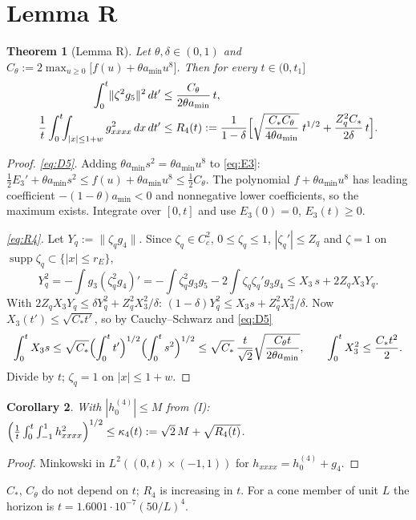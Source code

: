 \documentclass[11pt]{article}
\newtheorem{theorem}{Theorem}\newtheorem{lemma}[theorem]{Lemma}\newtheorem{corollary}[theorem]{Corollary}
\newcommand{\nrm}[1]{\lVert #1\rVert}\newcommand{\fn}[1]{\texttt{\detokenize{#1}}}
\begin{document}
\section{Lemma R}
\begin{theorem}[Lemma R]\label{thm:R}
Let $\theta,\delta\in(0,1)$ and $C_\theta:=2\max_{u\ge0}\bigl[f(u)+\theta a_{\min}u^8\bigr]$. Then for every $t\in(0,t_1]$
\begin{align}
\int_0^t\nrm{\zeta^2g_5}^2\,dt'&\le\frac{C_\theta}{2\theta a_{\min}}\,t,\label{eq:D5}\\
\frac1t\int_0^t\!\!\int_{|x|\le1+w}g_{xxxx}^2\,dx\,dt'&\le R_4(t):=\frac1{1-\delta}\Bigl[\sqrt{\frac{C_*C_\theta}{4\theta a_{\min}}}\;t^{1/2}+\frac{Z_q^2C_*}{2\delta}\,t\Bigr].\label{eq:R4}
\end{align}
\end{theorem}
\begin{proof}
\emph{\eqref{eq:D5}.} Adding $\theta a_{\min}s^2=\theta a_{\min}u^8$ to \eqref{eq:E3}: $\tfrac12E_3'+\theta a_{\min}s^2\le f(u)+\theta a_{\min}u^8\le\tfrac12C_\theta$. The polynomial $f+\theta a_{\min}u^8$ has leading coefficient $-(1-\theta)a_{\min}<0$ and nonnegative lower coefficients, so the maximum exists. Integrate over $[0,t]$ and use $E_3(0)=0$, $E_3(t)\ge0$.

\emph{\eqref{eq:R4}.} Let $Y_q:=\nrm{\zeta_qg_4}$. Since $\zeta_q\in C^2_c$, $0\le\zeta_q\le1$, $|\zeta_q'|\le Z_q$ and $\zeta=1$ on $\operatorname{supp}\zeta_q\subset\{|x|\le r_E\}$,
\[Y_q^2=-\int g_3(\zeta_q^2g_4)'=-\int\zeta_q^2g_3g_5-2\int\zeta_q\zeta_q'g_3g_4\le X_3\,s+2Z_qX_3Y_q .\]
With $2Z_qX_3Y_q\le\delta Y_q^2+Z_q^2X_3^2/\delta$: $(1-\delta)Y_q^2\le X_3s+Z_q^2X_3^2/\delta$. Now $X_3(t')\le\sqrt{C_*t'}$, so by Cauchy--Schwarz and \eqref{eq:D5}
\[\int_0^tX_3s\le\sqrt{C_*}\Bigl(\int_0^tt'\Bigr)^{1/2}\Bigl(\int_0^ts^2\Bigr)^{1/2}\le\sqrt{C_*}\,\frac{t}{\sqrt2}\sqrt{\frac{C_\theta t}{2\theta a_{\min}}},\qquad\int_0^tX_3^2\le\frac{C_*t^2}2 .\]
Divide by $t$; $\zeta_q=1$ on $|x|\le1+w$.
\end{proof}
\begin{corollary}\label{cor:h4}
With $|h_0^{(4)}|\le M$ from (I): $\Bigl(\frac1t\int_0^t\int_{-1}^1h_{xxxx}^2\Bigr)^{1/2}\le\kappa_4(t):=\sqrt2\,M+\sqrt{R_4(t)}$.
\end{corollary}
\begin{proof}Minkowski in $L^2((0,t)\times(-1,1))$ for $h_{xxxx}=h_0^{(4)}+g_4$.\end{proof}
\noindent $C_*$, $C_\theta$ do not depend on $t$; $R_4$ is increasing in $t$. For a cone member of unit $L$ the horizon is $t=1.6001\cdot10^{-7}(50/L)^4$.
\end{document}
